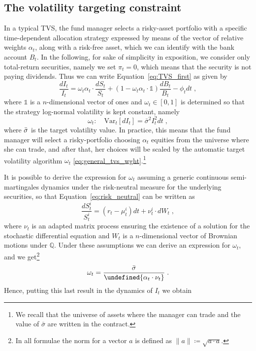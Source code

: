 \documentclass[runningheads]{m2ef}
\let\norm\undefined %
\DeclarePairedDelimiter\norm{\lVert}{\rVert}
\begin{document}
	\subsection{The volatility targeting constraint}
	In a typical TVS, the fund manager selects a risky-asset portfolio with a specific time-dependent allocation strategy expressed by means of the vector of relative weights $\alpha_t$, along with a risk-free asset, which we can identify with the bank account $B_t$. In the following, for sake of simplicity in exposition, we consider only total-return securities, namely we set $\pi_t=0$, which means that the security is not paying dividends. Thus we can write Equation~\eqref{eq:TVS_first} as given by
	\begin{equation}
		\frac{dI_t}{I_t}= \omega_t \alpha_t \cdot \frac{dS_t}{S_t} + \left(1-\omega_t  \alpha_t \cdot \mathds{1} \right)\frac{dB_t}{B_t}- \phi_t dt \; ,
	\label{eq:TVS_elegant}\end{equation}
	where $\mathds{1}$ is a $n$-dimensional vector of ones and $\omega_t\in[0,1]$ is determined so that the strategy log-normal volatility is kept constant, namely
	\begin{equation}
			\omega_t: \quad \mathrm{Var}_t[dI_t] = \bar{\sigma}^2I_t^2dt \; ,
	\label{eq:general_tvs_wght}\end{equation}
	where $\Bar{\sigma}$ is the target volatility value.
	In practice, this means that the fund manager will select a risky-portfolio choosing $\alpha_t$ equities from the universe where she can trade, and after that, her choices will be scaled by the automatic target volatility algorithm $\omega_t$ \eqref{eq:general_tvs_wght}.\footnote{We recall that the universe of assets where the manager can trade and the value of $\bar{\sigma}$ are written in the contract.}

	It is possible to derive the expression for $\omega_t$ assuming a generic continuous semi-martingales dynamics under the risk-neutral measure for the underlying securities, so that Equation~\eqref{eq:risk_neutral} can be written as 
	\begin{equation}
		\frac{dS_t^i}{S_t^i} = \left(r_t - \mu_t^i \right)dt + \nu_t^i \cdot dW_t \; ,
	\label{eq:Equity_process}\end{equation}
	where $\nu_t$ is an adapted matrix process ensuring the existence of a solution for the stochastic differential equation and $W_t$ is a $n$-dimensional vector of Brownian motions under $\mathbb{Q}$. Under these assumptions we can derive an expression for $\omega_t$, and we get\footnote{In all formulae the norm for a vector $a$ is defined as $\|a\|\coloneqq\sqrt{a\cdot a}$.}
	\begin{equation}
		\omega_t = \frac{\Bar{\sigma}}{\norm{ \alpha_t\cdot \nu_t }} \; .
	\end{equation}
	Hence, putting this last result in the dynamics of $I_t$ we obtain
\end{document}
